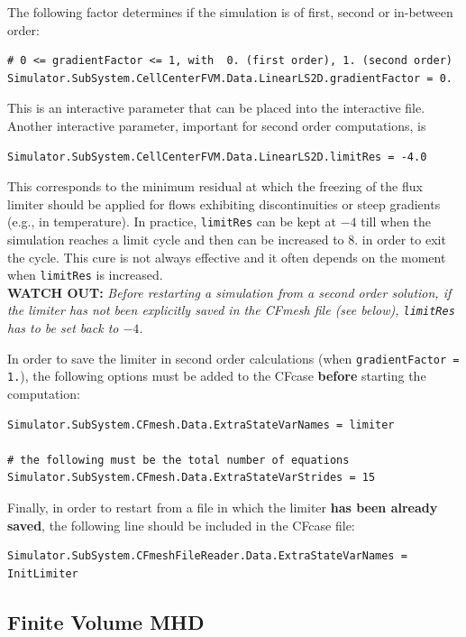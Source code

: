 \documentclass[11pt]{article}
\begin{document}
The following factor determines if the simulation is of first, second or in-between order:

\begin{lstlisting}[breaklines]
# 0 <= gradientFactor <= 1, with  0. (first order), 1. (second order)
Simulator.SubSystem.CellCenterFVM.Data.LinearLS2D.gradientFactor = 0.
\end{lstlisting}
This is an interactive parameter that can be placed into the interactive file. Another interactive parameter,
important for second order computations, is 

\begin{lstlisting}[breaklines]
Simulator.SubSystem.CellCenterFVM.Data.LinearLS2D.limitRes = -4.0
\end{lstlisting}
This corresponds to the minimum residual at which the freezing of the flux limiter should be applied for flows exhibiting discontinuities 
or steep gradients (e.g., in temperature). In practice, {\tt limitRes} can be kept at  $-4$ till when the simulation reaches a limit cycle and then can be increased to
$8.$ in order to exit the cycle. This cure is not always effective and it often depends on the moment when {\tt limitRes} is increased.\\
{\bf WATCH OUT:} {\it Before restarting a simulation from a second order solution, if the limiter has not been explicitly saved in the CFmesh file 
  (see below), {\tt limitRes} has to be set back to $-4$.}

In order to save the limiter in second order calculations (when {\tt gradientFactor = 1.}), the following options must be added to the CFcase {\bf before} 
starting the computation:

\begin{lstlisting}[breaklines]
Simulator.SubSystem.CFmesh.Data.ExtraStateVarNames = limiter

# the following must be the total number of equations
Simulator.SubSystem.CFmesh.Data.ExtraStateVarStrides = 15
\end{lstlisting}

Finally, in order to restart from a file in which the limiter {\bf has been already saved}, 
the following line should be included in the CFcase file:

\begin{lstlisting}[breaklines]
Simulator.SubSystem.CFmeshFileReader.Data.ExtraStateVarNames = InitLimiter
\end{lstlisting}

\subsection{Finite Volume MHD}
\end{document}
